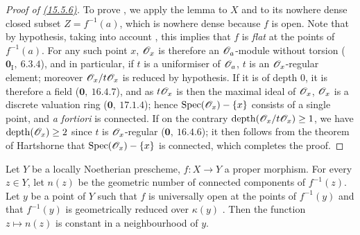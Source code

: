 \begin{proof}[Proof of {\rm {\hyperref[IV.15.5.6]{(15.5.6)}}}]
To prove , we apply the lemma  to $X$ and to its nowhere dense closed subset $Z=f^{-1}(a)$, which is nowhere dense because $f$ is open.
Note that by hypothesis, taking into account , this implies that $f$ is \emph{flat} at the points of $f^{-1}(a)$.
For any such point $x$, $\mathscr{O}_x$ is therefore an $\mathscr{O}_a$-module without torsion ($\mathbf{0}_{\mathrm{I}},~6.3.4$), and in particular, if $t$ is a uniformiser of $\mathscr{O}_a$, $t$ is an $\mathscr{O}_x$-regular element; moreover $\mathscr{O}_x/t\mathscr{O}_x$ is reduced by hypothesis. If it is of depth $0$, it is therefore a field ($\mathbf{0},~16.4.7$), and as $t\mathscr{O}_x$ is then the maximal ideal of $\mathscr{O}_x$, $\mathscr{O}_x$ is a discrete valuation ring ($\mathbf{0},~17.1.4$); hence $\operatorname{Spec}(\mathscr{O}_x)-\{x\}$ consists of a single point, and \emph{a fortiori} is connected.
If on the contrary $\operatorname{depth}(\mathscr{O}_x/t\mathscr{O}_x)\geq 1$, we have $\operatorname{depth}(\mathscr{O}_x)\geq 2$ since $t$ is $\mathscr{O}_x$-regular ($\mathbf{0},~16.4.6$); it then follows from the theorem of Hartshorne  that $\operatorname{Spec}(\mathscr{O}_x)-\{x\}$ is connected, which completes the proof.
\end{proof}

\begin{proposition}[15.5.7]
\label{IV.15.5.7}
Let $Y$ be a locally Noetherian prescheme, $f:X\to Y$ a proper morphism.
For every $z\in Y$, let $n(z)$ be the geometric number of connected components of $f^{-1}(z)$.
Let $y$ be a point of $Y$ such that $f$ is universally open at the points of $f^{-1}(y)$ and that $f^{-1}(y)$ is geometrically reduced over $\kappa(y)$ .
Then the function $z\mapsto n(z)$ is constant in a neighbourhood of $y$.
\end{proposition}

